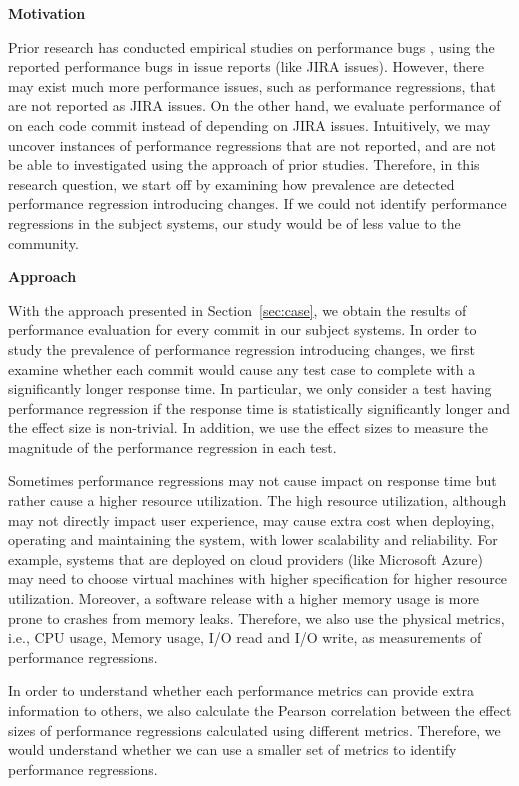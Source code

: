 \noindent \textbf{Motivation}

Prior research has conducted empirical studies on performance bugs \cite{Jin:2012}, using the reported performance bugs in issue reports (like JIRA issues). However, there may exist much more performance issues, such as performance regressions, that are not reported as JIRA issues. On the other hand, we evaluate performance of on each code commit instead of depending on JIRA issues. Intuitively, we may uncover instances of performance regressions that are not reported, and are not be able to investigated using the approach of prior studies. Therefore, in this research question, we start off by examining how prevalence are detected performance regression introducing changes. If we could not identify performance regressions in the subject systems, our study would be of less value to the community.


\noindent \textbf{Approach}

With the approach presented in Section~\ref{sec:case}, we obtain the results of performance evaluation for every commit in our subject systems. In order to study the prevalence of performance regression introducing changes, we first examine whether each commit would cause any test case to complete with a significantly longer response time. In particular, we only consider a test having performance regression if the response time is statistically significantly longer and the effect size is non-trivial. In addition, we use the effect sizes to measure the magnitude of the performance regression in each test. 

Sometimes performance regressions may not cause impact on response time but rather cause a higher resource utilization. The high resource utilization, although may not directly impact user experience, may cause extra cost when deploying, operating and maintaining the system, with lower scalability and reliability. For example, systems that are deployed on cloud providers (like Microsoft Azure) may need to choose virtual machines with higher specification for higher resource utilization. Moreover, a software release with a higher memory usage is more prone to crashes from memory leaks. Therefore, we also use the physical metrics, i.e., CPU usage, Memory usage, I/O read and I/O write, as measurements of performance regressions. 

In order to understand whether each performance metrics can provide extra information to others, we also calculate the Pearson correlation between the effect sizes of performance regressions calculated using different metrics. Therefore, we would understand whether we can use a smaller set of metrics to identify performance regressions.


